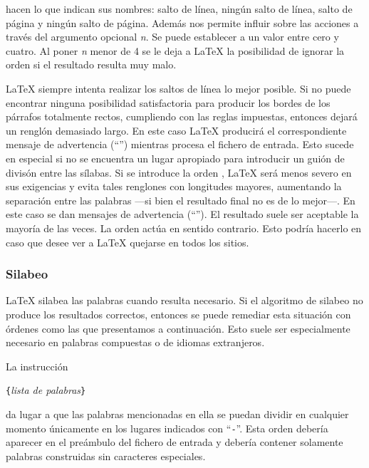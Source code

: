 \noindent hacen  lo que  indican sus nombres:  salto de  línea, ningún
salto de línea,  salto de página y ningún salto  de página. Además nos
permite influir  sobre las  acciones a  través del  argumento opcional
\emph{n}. Se puede establecer a un valor entre cero y cuatro. Al poner
\emph{n} menor de 4 se le deja a \LaTeX{} la posibilidad de ignorar la
orden si el resultado resulta muy malo.

\LaTeX{}  siempre  intenta  realizar  los saltos  de  línea  lo  mejor
posible. Si no puede  encontrar ninguna posibilidad satisfactoria para
producir los bordes de los  párrafos totalmente rectos, cumpliendo con
las reglas impuestas,  entonces dejará un renglón  demasiado largo. En
este caso \LaTeX{} producirá el correspondiente mensaje de advertencia
(``'')  mientras  procesa el  fichero  de  entrada.
Esto  sucede  en  especial  si  no se  encuentra  un  lugar  apropiado
para  introducir  un  guión  de  divisón  entre  las  sílabas.  Si  se
introduce  la orden  , \LaTeX{}  será menos  severo en  sus
exigencias y evita tales  renglones con longitudes mayores, aumentando
la  separación entre  las palabras  ---si bien  el resultado  final no
es  de lo  mejor---.  En  este caso  se  dan  mensajes de  advertencia
(``'').  El  resultado  suele  ser  aceptable  la
mayoría de las veces. La  orden  actúa en sentido contrario.
Esto podría hacerlo en caso que desee ver a \LaTeX{} quejarse en todos
los sitios.

\subsubsection{Silabeo} \label{hyph}

\LaTeX{}  silabea  las  palabras   cuando  resulta  necesario.  Si  el
algoritmo de silabeo no produce  los resultados correctos, entonces se
puede remediar esta  situación con órdenes como las  que presentamos a
continuación.  Esto  suele  ser especialmente  necesario  en  palabras
compuestas o de idiomas extranjeros.

La instrucción
\begin{command}
\verb|{|\emph{lista de palabras}\verb|}|
\end{command}

\noindent da  lugar a que las  palabras mencionadas en ella  se puedan
dividir en cualquier  momento únicamente en los  lugares indicados con
``\verb|-|''\@.  Esta  orden  debería  aparecer en  el  preámbulo  del
fichero de  entrada y debería contener  solamente palabras construidas
sin caracteres especiales.

